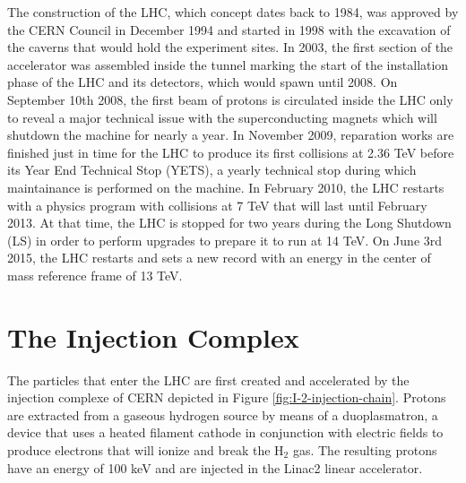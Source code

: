   The construction of the LHC, which concept dates back to 1984, was approved by the CERN Council in December 1994 and started in 1998 with the excavation of the caverns that would hold the experiment sites. In 2003, the first section of the accelerator was assembled inside the tunnel marking the start of the installation phase of the LHC and its detectors, which would spawn until 2008. On September 10th 2008, the first beam of protons is circulated inside the LHC only to reveal a major technical issue with the superconducting magnets which will shutdown the machine for nearly a year. In November 2009, reparation works are finished just in time for the LHC to produce its first collisions at 2.36 TeV before its Year End Technical Stop (YETS), a yearly technical stop during which maintainance is performed on the machine. In February 2010, the LHC restarts with a physics program with collisions at 7 TeV that will last until February 2013. At that time, the LHC is stopped for two years during the Long Shutdown (LS) in order to perform upgrades to prepare it to run at 14 TeV. On June 3rd 2015, the LHC restarts and sets a new record with an energy in the center of mass reference frame of 13 TeV.

  \section{The Injection Complex}

    The particles that enter the LHC are first created and accelerated by the injection complexe of CERN depicted in Figure \ref{fig:I-2-injection-chain}. Protons are extracted from a gaseous hydrogen source by means of a duoplasmatron, a device that uses a heated filament cathode in conjunction with electric fields to produce electrons that will ionize and break the H$_2$ gas. The resulting protons have an energy of 100 keV and are injected in the Linac2 linear accelerator. \\

